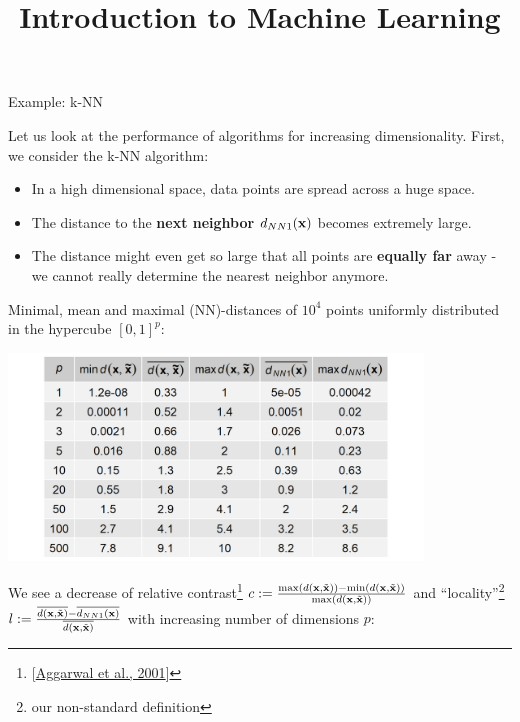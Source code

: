 \documentclass[11pt,compress,t,notes=noshow, xcolor=table]{beamer}
\title{Introduction to Machine Learning}
\begin{document}
    

\begin{vbframe}{Example: k-NN}

Let us look at the performance of algorithms for increasing dimensionality. First, we consider the k-NN algorithm:

\begin{itemize}
\item In a high dimensional space, data points are spread across a huge space.
\item The distance to the \textbf{next neighbor} $d_{NN1}(\mathbf{x})$ becomes extremely large.
\item The distance might even get so large that all points are \textbf{equally far} away - we cannot really determine the nearest neighbor anymore.
\end{itemize}

\framebreak 

Minimal, mean and maximal (NN)-distances of $10^{4}$ points uniformly distributed in the hypercube $[0,1]^p$:

\begin{center}
\includegraphics[width = 11cm ]{figure/knn_table.png}
\end{center}

\framebreak

We see a decrease of relative contrast\footnote{[\href{https://bib.dbvis.de/uploadedFiles/155.pdf}{Aggarwal et al., 2001}]} $c := \frac{\max(d(\mathbf{x},\tilde{\mathbf{x}})) - \min(d(\mathbf{x},\tilde{\mathbf{x}}))}{\max(d(\mathbf{x},\tilde{\mathbf{x}}))}$ and \enquote{locality}\footnote{our non-standard definition} $l := \frac{\overline{d(\mathbf{x},\tilde{\mathbf{x}})} -  \overline{d_{NN1}(\mathbf{x})}}{\overline{d(\mathbf{x},\tilde{\mathbf{x}})}}$ with increasing number of dimensions $p$:



\end{vbframe}
\end{document}
